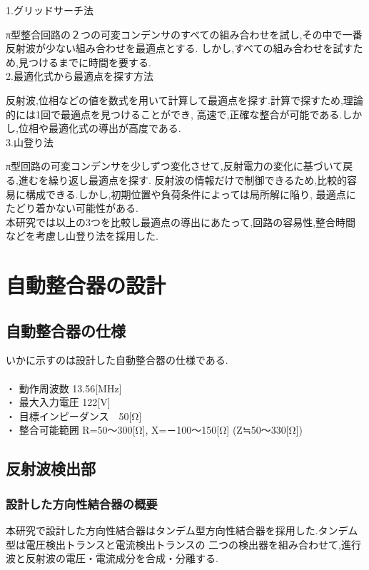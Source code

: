 \documentclass[uplatex, 12pt]{ujbook}
\begin{document}
1.グリッドサーチ法

π型整合回路の２つの可変コンデンサのすべての組み合わせを試し,その中で一番反射波が少ない組み合わせを最適点とする.
しかし,すべての組み合わせを試すため,見つけるまでに時間を要する.\\

2.最適化式から最適点を探す方法

反射波,位相などの値を数式を用いて計算して最適点を探す.計算で探すため,理論的には1回で最適点を見つけることができ,
高速で,正確な整合が可能である.しかし,位相や最適化式の導出が高度である.\\

3.山登り法

π型回路の可変コンデンサを少しずつ変化させて,反射電力の変化に基づいて戻る,進むを繰り返し最適点を探す.
反射波の情報だけで制御できるため,比較的容易に構成できる.しかし,初期位置や負荷条件によっては局所解に陥り,
最適点にたどり着かない可能性がある.\\

本研究では以上の3つを比較し最適点の導出にあたって,回路の容易性,整合時間などを考慮し山登り法を採用した.
\chapter{自動整合器の設計}

\section{自動整合器の仕様}
 いかに示すのは設計した自動整合器の仕様である.\\\\
・  動作周波数         13.56[MHz]\\
・  最大入力電圧       122[V]\\ 
・  目標インピーダンス　50[Ω]\\
・  整合可能範囲       R=50～300[Ω], X=－100～150[Ω] (Z≒50～330[Ω])
\section{反射波検出部}
 \subsection{設計した方向性結合器の概要}
 本研究で設計した方向性結合器はタンデム型方向性結合器を採用した.タンデム型は電圧検出トランスと電流検出トランスの
 二つの検出器を組み合わせて,進行波と反射波の電圧・電流成分を合成・分離する.
\end{document}
